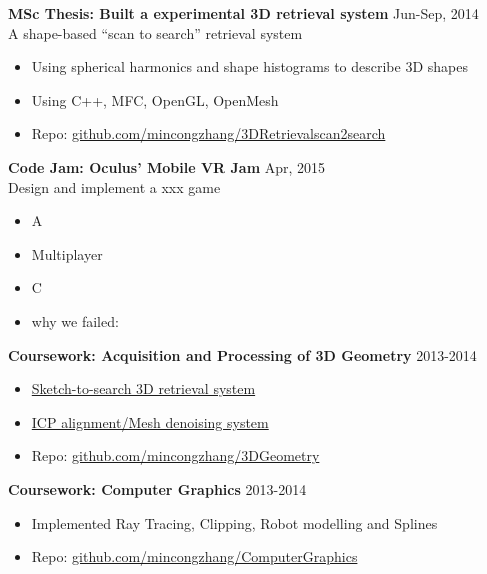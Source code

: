 \documentclass[line,margin]{res}
\begin{document}
\begin{resume}
{\bf MSc Thesis: Built a experimental 3D retrieval system} \hfill{\textcolor[rgb]{0.7,0.7,0.7}{Jun-Sep, 2014}}\\
A shape-based ``scan to search'' retrieval system
\begin{itemize}\itemsep -2pt %
    \item Using spherical harmonics and shape histograms to describe 3D shapes
    \item Using C++, MFC, OpenGL, OpenMesh
    \item Repo: \href{https://github.com/mincongzhang/3D\textunderscore Retrieval\textunderscore scan2search}{github.com/mincongzhang/3D\textunderscore  Retrieval\textunderscore scan2search}
\end{itemize}

{\bf Code Jam: Oculus' Mobile VR Jam}
\hfill{\textcolor[rgb]{0.7,0.7,0.7}{Apr, 2015}}\\
Design and implement a xxx game
\begin{itemize}\itemsep -2pt %
    \item A
    \item Multiplayer
    \item C
    \item why we failed:
\end{itemize}

{\bf Coursework: Acquisition and Processing of 3D Geometry}
\hfill{\textcolor[rgb]{0.7,0.7,0.7}{2013-2014}}
\begin{itemize}\itemsep -2pt %
    \item \href{https://github.com/mincongzhang/3D_Retrieval_sketch2search}{Sketch-to-search 3D retrieval system}
    \item \href{https://github.com/mincongzhang/PlayWithOpenMesh}{ICP alignment/Mesh denoising system}
    \item Repo: \href{https://github.com/mincongzhang/3DGeometry}{github.com/mincongzhang/3DGeometry}
\end{itemize}

{\bf Coursework: Computer Graphics}
\hfill{\textcolor[rgb]{0.7,0.7,0.7}{2013-2014}}
\begin{itemize}\itemsep -2pt %
    \item Implemented Ray Tracing, Clipping, Robot modelling and Splines
    \item Repo: \href{https://github.com/mincongzhang/ComputerGraphics}{github.com/mincongzhang/ComputerGraphics}
\end{itemize}


\end{resume}
\end{document}
